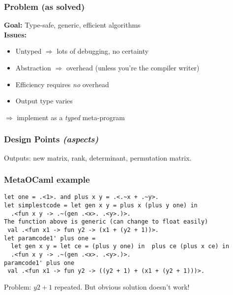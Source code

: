 \documentclass{beamer}
\begin{document}
\begin{frame}
    \frametitle{Problem (as solved)}
    \textbf{Goal:} Type-safe, generic, efficient algorithms\\
    \textbf{Issues:}
    \begin{itemize}
        \item Untyped $\Rightarrow$ lots of debugging, no certainty
        \item Abstraction $\Rightarrow$ overhead 
            (unless you're the compiler writer)
        \item Efficiency requires \emph{no} overhead
        \item Output type varies
    \end{itemize}
    $\Longrightarrow$ implement as a \emph{typed} meta-program
\end{frame}

\begin{frame}
\frametitle{Design Points \emph{(aspects)}}
Outputs: new matrix, rank, determinant, permutation matrix.
\end{frame}

\begin{frame}[fragile]
\frametitle{MetaOCaml example}
\begin{verbatim}
let one = .<1>. and plus x y = .<.~x + .~y>.
let simplestcode = let gen x y = plus x (plus y one) in
  .<fun x y -> .~(gen .<x>. .<y>.)>.
The function above is generic (can change to float easily)
 val .<fun x1 -> fun y2 -> (x1 + (y2 + 1))>.
let paramcode1' plus one =
  let gen x y = let ce = (plus y one) in  plus ce (plus x ce) in
  .<fun x y -> .~(gen .<x>. .<y>.)>.
paramcode1' plus one
 val .<fun x1 -> fun y2 -> ((y2 + 1) + (x1 + (y2 + 1)))>.
\end{verbatim}
Problem: $y2+1$ repeated.  But obvious solution doesn't work!
\end{frame}
\end{document}
